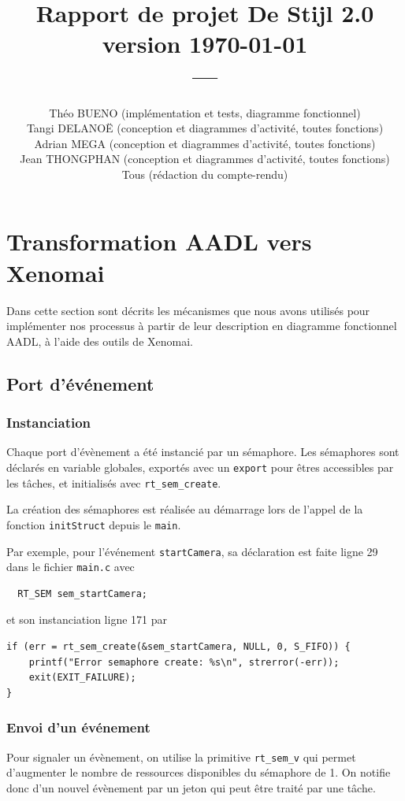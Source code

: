 \documentclass[11pt, a4paper]{paper}
\title{{\Huge Rapport de projet De Stijl 2.0}\\
{\large version \today}\\
---\\
}
\author{
    {Théo BUENO (implémentation et tests, diagramme fonctionnel)}\\
    {Tangi DELANOË (conception et diagrammes d'activité, toutes fonctions)}\\
    {Adrian MEGA (conception et diagrammes d'activité, toutes fonctions)}\\
    {Jean THONGPHAN (conception et diagrammes d'activité, toutes fonctions)}\\
    {Tous (rédaction du compte-rendu)}
}
\begin{document}
\maketitle

\tableofcontents

\newpage

\section{Transformation AADL vers Xenomai}
Dans cette section sont décrits les mécanismes que nous avons utilisés pour implémenter nos processus à partir de leur description en diagramme fonctionnel AADL, à l'aide des outils de Xenomai.

\subsection{Port d’événement}

\subsubsection{Instanciation}
\label{event_sema}
Chaque port d'évènement a été instancié par un sémaphore.
Les sémaphores sont déclarés en variable globales, exportés avec un {\tt export} pour êtres accessibles par les tâches, et initialisés avec {\tt rt\_sem\_create}.

La création des sémaphores est réalisée au démarrage lors de l'appel de la fonction {\tt initStruct} depuis le {\tt main}.

Par exemple, pour l'événement {\tt startCamera}, sa déclaration est faite ligne 29 dans le fichier {\tt main.c} avec
\begin{verbatim}
  RT_SEM sem_startCamera;
\end{verbatim}
et son instanciation ligne 171 par 
\begin{verbatim}
if (err = rt_sem_create(&sem_startCamera, NULL, 0, S_FIFO)) {
    printf("Error semaphore create: %s\n", strerror(-err));
    exit(EXIT_FAILURE);
}
\end{verbatim}

\subsubsection{Envoi d’un événement}
Pour signaler un évènement, on utilise la primitive {\tt rt\_sem\_v} qui permet d'augmenter le nombre de ressources disponibles du sémaphore de 1. On notifie donc d'un nouvel évènement par un jeton qui peut être traité par une tâche.
\end{document}
